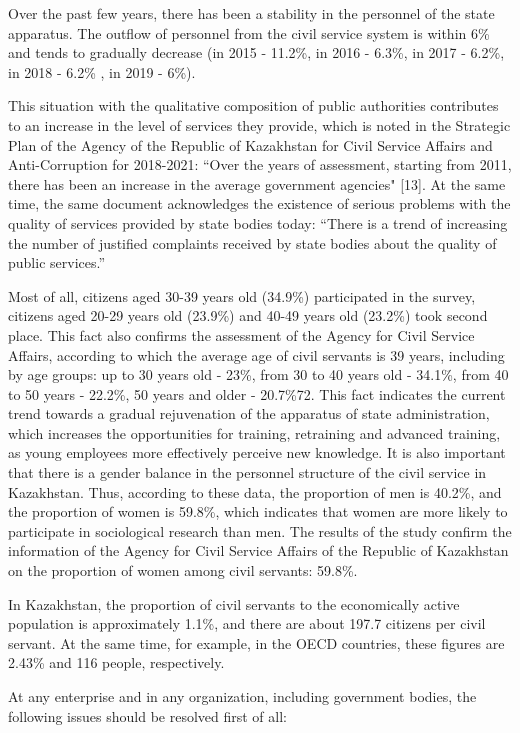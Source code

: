 \begin{multicols}{2}
Over the past few years, there has been a stability in the personnel of
the state apparatus. The outflow of personnel from the civil service
system is within 6\% and tends to gradually decrease (in 2015 - 11.2\%,
in 2016 - 6.3\%, in 2017 - 6.2\%, in 2018 - 6.2\% , in 2019 - 6\%).

This situation with the qualitative composition of public authorities
contributes to an increase in the level of services they provide, which
is noted in the Strategic Plan of the Agency of the Republic of
Kazakhstan for Civil Service Affairs and Anti-Corruption for 2018-2021:
``Over the years of assessment, starting from 2011, there has been an
increase in the average government agencies" {[}13{]}. At the same time,
the same document acknowledges the existence of serious problems with
the quality of services provided by state bodies today: ``There is a
trend of increasing the number of justified complaints received by state
bodies about the quality of public services.''

Most of all, citizens aged 30-39 years old (34.9\%) participated in the
survey, citizens aged 20-29 years old (23.9\%) and 40-49 years old
(23.2\%) took second place. This fact also confirms the assessment of
the Agency for Civil Service Affairs, according to which the average age
of civil servants is 39 years, including by age groups: up to 30 years
old - 23\%, from 30 to 40 years old - 34.1\%, from 40 to 50 years -
22.2\%, 50 years and older - 20.7\%72. This fact indicates the current
trend towards a gradual rejuvenation of the apparatus of state
administration, which increases the opportunities for training,
retraining and advanced training, as young employees more effectively
perceive new knowledge. It is also important that there is a gender
balance in the personnel structure of the civil service in Kazakhstan.
Thus, according to these data, the proportion of men is 40.2\%, and the
proportion of women is 59.8\%, which indicates that women are more
likely to participate in sociological research than men. The results of
the study confirm the information of the Agency for Civil Service
Affairs of the Republic of Kazakhstan on the proportion of women among
civil servants: 59.8\%.

In Kazakhstan, the proportion of civil servants to the economically
active population is approximately 1.1\%, and there are about 197.7
citizens per civil servant. At the same time, for example, in the OECD
countries, these figures are 2.43\% and 116 people, respectively.

At any enterprise and in any organization, including government bodies,
the following issues should be resolved first of all:


\end{multicols}
